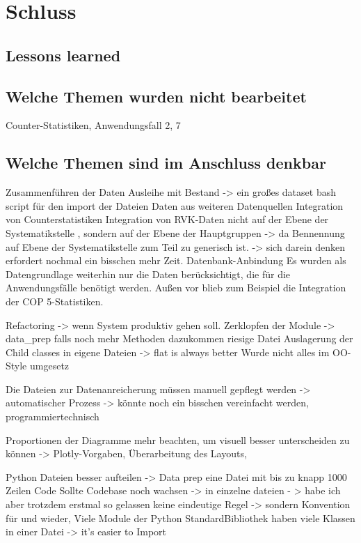 
\chapter{Schluss}
\label{chap:six}
\section{Lessons learned}
\section{Welche Themen wurden nicht bearbeitet}
Counter-Statistiken, Anwendungsfall 2, 7

\section{Welche Themen sind im Anschluss denkbar}
Zusammenführen der Daten Ausleihe mit Bestand -> ein großes dataset
bash script für den import der Dateien
Daten aus weiteren Datenquellen
Integration von Counterstatistiken
Integration von RVK-Daten nicht auf der Ebene der Systematikstelle , sondern auf der Ebene
der Hauptgruppen -> da Bennennung auf Ebene der Systematikstelle zum Teil zu generisch ist. 
-> sich darein denken erfordert nochmal ein bisschen mehr Zeit.
Datenbank-Anbindung
Es wurden als Datengrundlage weiterhin nur die Daten berücksichtigt, 
    die für die Anwendungsfälle benötigt werden. Außen vor blieb zum Beispiel die Integration der \acrshort{COP 5}-Statistiken.

Refactoring -> wenn System produktiv gehen soll.
Zerklopfen der Module -> data\_prep falls noch mehr Methoden dazukommen  riesige Datei Auslagerung der Child classes in eigene Dateien
-> flat is always better
Wurde nicht alles im OO-Style umgesetz

Die Dateien zur Datenanreicherung müssen manuell gepflegt werden -> automatischer Prozess -> könnte noch ein bisschen vereinfacht werden,
programmiertechnisch

Proportionen der Diagramme mehr beachten, um visuell besser unterscheiden zu können -> Plotly-Vorgaben, Überarbeitung des Layouts,

Python Dateien besser aufteilen -> Data prep eine Datei mit bis zu knapp 1000 Zeilen Code
    Sollte Codebase noch wachsen -> in einzelne dateien - > habe ich aber trotzdem erstmal so gelassen
    keine eindeutige Regel -> sondern Konvention für und wieder, Viele Module der Python StandardBibliothek
    haben viele Klassen in einer Datei -> it's easier to Import